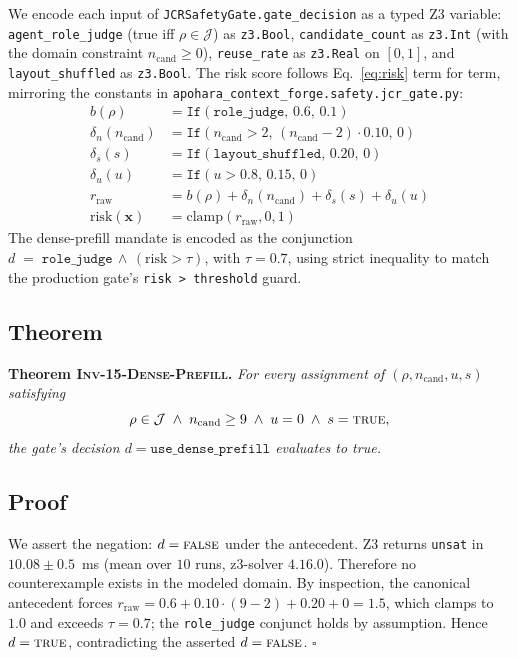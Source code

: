 \documentclass[10pt,twocolumn]{article}
\newcommand{\Risk}{\mathrm{risk}}
\newcommand{\Judge}{\mathcal{J}}
\newcommand{\Cand}{n_{\text{cand}}}
\newcommand{\Reuse}{u}
\newcommand{\Shuf}{s}
\newcommand{\code}[1]{\texttt{\small #1}}
\begin{document}
We encode each input of \code{JCRSafetyGate.gate\_decision} as a
typed Z3 variable: \texttt{agent\_role\_judge} (true iff
$\rho \in \Judge$) as \code{z3.Bool}, \texttt{candidate\_count} as \code{z3.Int} (with
the domain constraint $\Cand \geq 0$), \texttt{reuse\_rate} as
\code{z3.Real} on $[0, 1]$, and \texttt{layout\_shuffled} as
\code{z3.Bool}. The risk score follows Eq.~\ref{eq:risk} term for
term, mirroring the constants in
\code{apohara\_context\_forge.safety.jcr\_gate.py}:
\begin{align*}
  b(\rho)            &= \mathtt{If}(\mathtt{role\_judge},\,
                       0.6,\,0.1) \\
  \delta_n(\Cand)    &= \mathtt{If}(\Cand > 2,\,
                       (\Cand - 2) \cdot 0.10,\, 0) \\
  \delta_s(\Shuf)    &= \mathtt{If}(\mathtt{layout\_shuffled},\,
                       0.20,\, 0) \\
  \delta_u(\Reuse)   &= \mathtt{If}(\Reuse > 0.8,\,
                       0.15,\, 0) \\
  r_{\mathrm{raw}}   &= b(\rho) + \delta_n(\Cand)
                       + \delta_s(\Shuf) + \delta_u(\Reuse) \\
  \Risk(\mathbf{x})  &= \mathrm{clamp}(r_{\mathrm{raw}}, 0, 1)
\end{align*}
The dense-prefill mandate is encoded as the conjunction
$d \;=\; \mathtt{role\_judge} \,\wedge\,
 (\Risk > \tau)$, with $\tau = 0.7$, using strict inequality to
match the production gate's \texttt{risk > threshold} guard.

\subsection{Theorem}
\label{ssec:z3-theorem}

\noindent\textbf{Theorem \textsc{Inv-15-Dense-Prefill}.}
\emph{For every assignment of
$(\rho, \Cand, \Reuse, \Shuf)$ satisfying}
\[
  \rho \in \Judge \;\land\; \Cand \geq 9 \;\land\;
  \Reuse = 0 \;\land\; \Shuf = \textsc{true},
\]
\emph{the gate's decision $d = \texttt{use\_dense\_prefill}$
evaluates to true.}

\subsection{Proof}

We assert the negation: $d = \textsc{false}$ under the antecedent.
Z3 returns \texttt{unsat} in $10.08 \pm 0.5$~ms (mean over $10$
runs, z3-solver $4.16.0$). Therefore no counterexample exists in
the modeled domain. By inspection, the canonical antecedent forces
$r_{\mathrm{raw}} = 0.6 + 0.10 \cdot (9 - 2) + 0.20 + 0 = 1.5$,
which clamps to $1.0$ and exceeds $\tau = 0.7$; the
\texttt{role\_judge} conjunct holds by assumption. Hence
$d = \textsc{true}$, contradicting the asserted
$d = \textsc{false}$. $\square$
\end{document}
